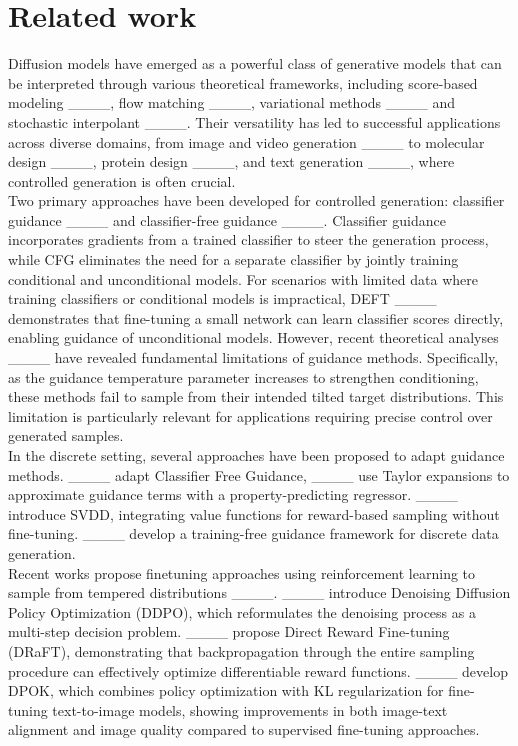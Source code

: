 \section{Related work}
Diffusion models have emerged as a powerful class of generative models that can be interpreted through various theoretical frameworks, including score-based modeling ____, flow matching ____, variational methods ____ and stochastic interpolant ____. Their versatility has led to successful applications across diverse domains, from image and video generation ____  to molecular design ____, protein design ____, and text generation ____, where controlled generation is often crucial. \\
Two primary approaches have been developed for controlled generation: classifier guidance ____ and classifier-free guidance ____. Classifier guidance incorporates gradients from a trained classifier to steer the generation process, while CFG eliminates the need for a separate classifier by jointly training conditional and unconditional models. For scenarios with limited data where training classifiers or conditional models is impractical, DEFT ____ demonstrates that fine-tuning a small network can learn classifier scores directly, enabling guidance of unconditional models.
However, recent theoretical analyses ____ have revealed fundamental limitations of guidance methods. Specifically, as the guidance temperature parameter increases to strengthen conditioning, these methods fail to sample from their intended tilted target distributions. This limitation is particularly relevant for applications requiring precise control over generated samples.\\
In the discrete setting, several approaches have been proposed to adapt guidance methods. ____ adapt Classifier Free Guidance, ____ use Taylor expansions to approximate guidance terms with a property-predicting regressor. ____ introduce SVDD, integrating value functions for reward-based sampling without fine-tuning. ____ develop a training-free guidance framework for discrete data generation. \\
Recent works propose finetuning approaches using reinforcement learning to sample from tempered distributions ____. ____ introduce Denoising Diffusion Policy Optimization (DDPO), which reformulates the denoising process as a multi-step decision problem. ____ propose Direct Reward Fine-tuning (DRaFT), demonstrating that backpropagation through the entire sampling procedure can effectively optimize differentiable reward functions. ____  develop DPOK, which combines policy optimization with KL regularization for fine-tuning text-to-image models, showing improvements in both image-text alignment and image quality compared to supervised fine-tuning approaches.